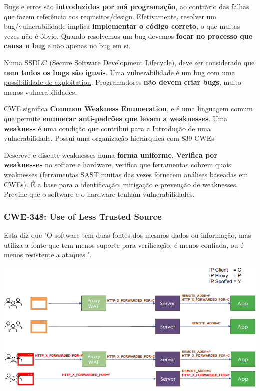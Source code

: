 \documentclass{article}
\begin{document}
Bugs e erros são \textbf{introduzidos por má programação},
ao contrário das falhas que fazem referência aos requisitos/design.
Efetivamente, resolver um bug/vulnerabilidade implica \textbf{implementar
o código correto}, o que muitas vezes não é óbvio.
Quando resolvemos um bug devemos \textbf{focar no processo que causa o bug}
e não apenas no bug em si.

\vspace{2mm}

Numa SSDLC (Secure Software Development Lifecycle), deve ser considerado
que \textbf{nem todos os bugs são iguais}.
Uma \uline{vulnerabilidade é um bug com uma possibilidade de exploitation}.
Programadores \textbf{não devem criar bugs}, muito menos vulnerabilidades.

\pagebreak

CWE significa \textbf{Common Weakness Enumeration}, e é uma linguagem
comum que permite \textbf{enumerar anti-padrões que levam a weaknesses}.
Uma \textbf{weakness} é uma condição que contribui para a Introdução
de uma vulnerabilidade.
Possui uma organização hierárquica com 839 CWEs

Descreve e discute weaknesses numa \textbf{forma uniforme},
\textbf{Verifica por weaknesses} no softare e hardware,
verifica que ferramentas cobrem quais weaknesses
(ferramentas SAST muitas das vezes fornecem análises baseadas
em CWEs). É a base para a \uline{identificação, mitigação e prevenção
de weaknesses}. Previne que o software e o hardware tenham
vulnerabilidades.

\subsubsection{CWE-348: Use of Less Trusted Source}

Esta diz que "O software tem duas fontes dos mesmos dados
ou informação, mas utiliza a fonte que tem menos suporte para verificação,
é menos confiada, ou é menos resistente a ataques.".

\begin{center}
  \includegraphics[scale=0.6]{117}
\end{center}
\end{document}

